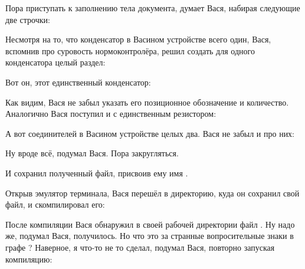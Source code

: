 Пора приступать к заполнению тела документа, думает Вася, набирая следующие
две строчки:


Несмотря на то, что конденсатор в Васином устройстве всего один, Вася, вспомнив
про суровость нормоконтролёра,  решил создать для одного конденсатора целый
раздел:


Вот он, этот единственный конденсатор:


Как видим, Вася не забыл указать его позиционное обозначение и
количество. Аналогично Вася поступил и с единственным резистором:


А вот соединителей в Васином устройстве целых два. Вася не забыл и про них:


Ну вроде всё, подумал Вася. Пора закругляться.


И сохранил полученный файл, присвоив ему имя .

Открыв эмулятор терминала, Вася перешёл в директорию, куда он сохранил свой
файл, и скомпилировал его:


После компиляции Вася обнаружил в своей рабочей директории файл
. Ну надо же, подумал Вася, получилось. Но что это за странные
вопросительные знаки в графе ? Наверное, я что-то не то сделал,
подумал Вася, повторно запуская компиляцию:


